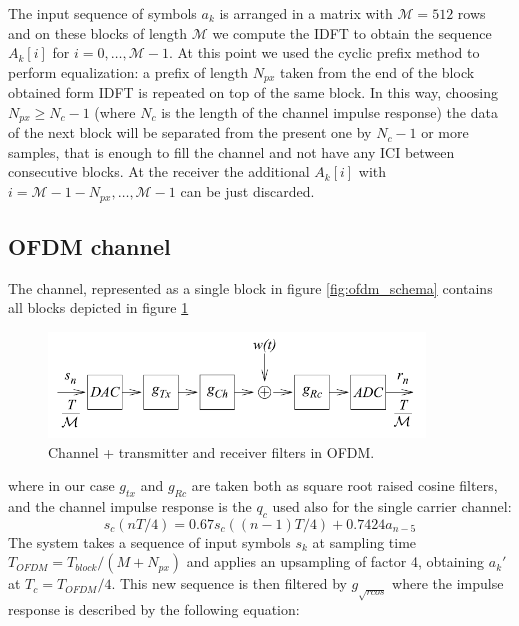 \documentclass[a4paper,11.5pt]{article}
\begin{document}
The input sequence of symbols $a_k$ is arranged in a matrix with $\mathcal{M}=512$ rows and on these blocks of length $\mathcal{M}$ we compute the IDFT to obtain the sequence $A_k[i]$ for $i=0,\dots , \mathcal{M}-1$. At this point we used the cyclic prefix method to perform equalization: a prefix of length $N_{px}$ taken from the end of the block obtained form IDFT is repeated on top of the same block. In this way, choosing $N_{px}\geq N_c-1$ (where $N_c$ is the length of the channel impulse response) the data of the next block will be separated from the present one by $N_c-1$ or more samples, that is enough to fill the channel and not have any ICI between consecutive blocks. At the receiver the additional $A_k[i]$ with $i=\mathcal{M}-1-N_{px},\dots ,\mathcal{M}-1$ can be just discarded.

\subsection*{OFDM channel}

The channel, represented as a single block in figure \ref{fig:ofdm_schema} contains all blocks depicted in figure \ref{fig:ofdm_channel_schema}

\begin{figure}[H]
	\begin{center}   
		\includegraphics[width=10cm]{figs/OFDM_channel_schema.png} 
		\caption{Channel + transmitter and receiver filters in OFDM.}
		\label{fig:ofdm_channel_schema}
	\end{center}
\end{figure}

where in our case $g_{tx}$ and $g_{Rc}$ are taken both as square root raised cosine filters, and the channel impulse response is the $q_c$ used also for the single carrier channel: 
\begin{equation}\label{eq:q_c}
s_c(nT/4) = 0.67 s_c((n-1)T/4) + 0.7424 a_{n-5}
\end{equation}
The system takes a sequence of input symbols $s_k$ at sampling time $T_{OFDM}=T_{block}/(M + N_{px})$ and applies an upsampling of factor 4, obtaining $a_k'$ at $T_c = T_{OFDM}/4$. This new sequence is then filtered by $g_{\sqrt{rcos}}$ where the impulse response is described by the following equation:
\end{document}
